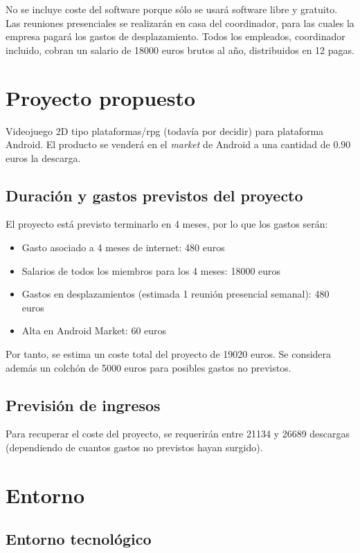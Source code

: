 No se incluye coste del software porque sólo se usará software libre y
gratuito. Las reuniones presenciales se realizarán en casa del coordinador,
para las cuales la empresa pagará los gastos de desplazamiento. Todos los
empleados, coordinador incluido, cobran un salario de 18000 euros brutos al
año, distribuidos en 12 pagas.

\section{Proyecto propuesto}

Videojuego 2D tipo plataformas/rpg (todavía por decidir) para plataforma
Android. El producto se venderá en el {\em market} de Android a una cantidad de
$0.90$ euros la descarga.

\subsection{Duración y gastos previstos del proyecto}

El proyecto está previsto terminarlo en 4 meses, por lo que los gastos serán:

\begin{itemize}
\item Gasto asociado a 4 meses de internet: 480 euros
\item Salarios de todos los miembros para los 4 meses: 18000 euros
\item Gastos en desplazamientos (estimada 1 reunión presencial semanal): 480 euros
\item Alta en Android Market: 60 euros
\end{itemize}

Por tanto, se estima un coste total del proyecto de 19020 euros. Se considera
además un colchón de 5000 euros para posibles gastos no previstos.

\subsection{Previsión de ingresos}

Para recuperar el coste del proyecto, se requerirán entre 21134 y 26689
descargas (dependiendo de cuantos gastos no previstos hayan surgido).

\section{Entorno}

\subsection{Entorno tecnológico}

